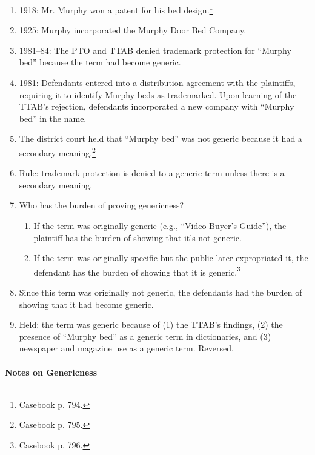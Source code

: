 \begin{enumerate}
    \item 1918: Mr. Murphy won a patent for his bed design.\footnote{Casebook 
    p. 794.}
    \item 1925: Murphy incorporated the Murphy Door Bed Company.
    \item 1981--84: The PTO and TTAB denied trademark protection for ``Murphy 
    bed'' because the term had become generic.
    \item 1981: Defendants entered into a distribution agreement with the 
    plaintiffs, requiring it to identify Murphy beds as trademarked. Upon 
    learning of the TTAB's rejection, defendants incorporated a new company 
    with ``Murphy bed'' in the name.
    \item The district court held that ``Murphy bed'' was not generic because 
    it had a secondary meaning.\footnote{Casebook p. 795.}
    \item Rule: trademark protection is denied to a generic term unless there 
    is a secondary meaning.
    \item Who has the burden of proving genericness?
    \begin{enumerate}
        \item If the term was originally generic (e.g., ``Video Buyer's 
        Guide''), the plaintiff has the burden of showing that it's not 
        generic.
        \item If the term was originally specific but the public later 
        expropriated it, the defendant has the burden of showing that it is 
        generic.\footnote{Casebook p. 796.}
    \end{enumerate}
    \item Since this term was originally not generic, the defendants had the 
    burden of showing that it had become generic.
    \item Held: the term was generic because of (1) the TTAB's findings, (2) 
    the presence of ``Murphy bed'' as a generic term in dictionaries, and (3) 
    newspaper and magazine use as a generic term. Reversed.
\end{enumerate}

\paragraph{Notes on Genericness}

